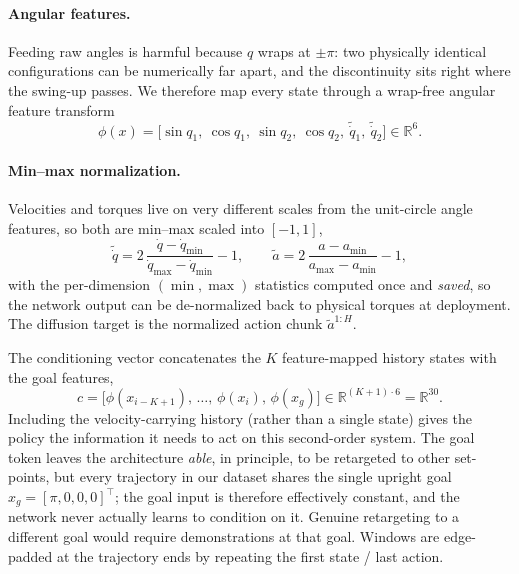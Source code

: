 \documentclass[11pt,a4paper]{article}
\begin{document}
\paragraph{Angular features.}
Feeding raw angles is harmful because $q$ wraps at $\pm\pi$: two physically
identical configurations can be numerically far apart, and the discontinuity sits
right where the swing-up passes. We therefore map every state through a
wrap-free angular feature transform
\begin{equation}
  \phi(x) = \big[\sin q_1,\ \cos q_1,\ \sin q_2,\ \cos q_2,\ \tilde{\dot q}_1,\ \tilde{\dot q}_2\big]
            \in \mathbb{R}^{6}.
\end{equation}

\paragraph{Min--max normalization.}
Velocities and torques live on very different scales from the unit-circle angle
features, so both are min--max scaled into $[-1, 1]$,
\begin{equation}
  \tilde{\dot q} = 2\,\frac{\dot q - \dot q_{\min}}{\dot q_{\max} - \dot q_{\min}} - 1,
  \qquad
  \tilde a = 2\,\frac{a - a_{\min}}{a_{\max} - a_{\min}} - 1,
\end{equation}
with the per-dimension $(\min,\max)$ statistics computed once and \emph{saved}, so
the network output can be de-normalized back to physical torques at deployment. The
diffusion target is the normalized action chunk $\tilde a^{1:H}$.

The conditioning vector concatenates the $K$ feature-mapped history states with the
goal features,
\begin{equation}
  c = \big[\phi(x_{i-K+1}),\, \ldots,\, \phi(x_i),\, \phi(x_g)\big]
      \in \mathbb{R}^{(K+1)\cdot 6} = \mathbb{R}^{30}.
\end{equation}
Including the velocity-carrying history (rather than a single state) gives the
policy the information it needs to act on this second-order system. The goal token
leaves the architecture \emph{able}, in principle, to be retargeted to other
set-points, but every trajectory in our dataset shares the single upright goal
$x_g = [\pi,0,0,0]^\top$; the goal input is therefore effectively constant, and the
network never actually learns to condition on it. Genuine retargeting to a
different goal would require demonstrations at that goal. Windows are edge-padded at
the trajectory ends by repeating the first state / last action.
\end{document}
